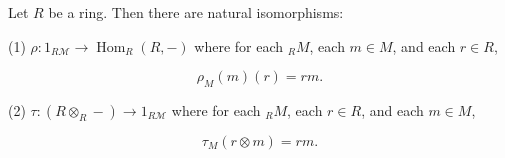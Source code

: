 Let $R$ be a ring. Then there are natural isomorphisms:

(1) $\rho: 1_{R\mathcal{M}} \to \operatorname{Hom}_R(R, -)$ where for each ${}_R M$, each $m \in M$, and each $r \in R$,

$$\rho_M(m)(r) = rm.$$

(2) $\tau: (R \otimes_R -) \to 1_{R\mathcal{M}}$ where for each ${}_R M$, each $r \in R$, and each $m \in M$,

$$\tau_M(r \otimes m) = rm.$$
